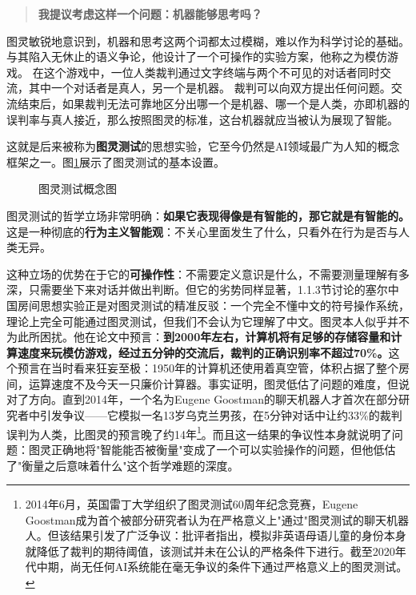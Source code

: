 \begin{quote}
\textbf{我提议考虑这样一个问题：机器能够思考吗？}
\end{quote}

图灵敏锐地意识到，机器和思考这两个词都太过模糊，难以作为科学讨论的基础。
与其陷入无休止的语义争论，他设计了一个可操作的实验方案，他称之为模仿游戏。
在这个游戏中，一位人类裁判通过文字终端与两个不可见的对话者同时交流，其中一个对话者是真人，另一个是机器。
裁判可以向双方提出任何问题。交流结束后，如果裁判无法可靠地区分出哪一个是机器、哪一个是人类，亦即机器的误判率与真人接近，那么按照图灵的标准，这台机器就应当被认为展现了智能。

这就是后来被称为\textbf{图灵测试}的思想实验，它至今仍然是AI领域最广为人知的概念框架之一。图\ref{fig:ch1_05}展示了图灵测试的基本设置。

\begin{figure}[htbp]
\centering
{}
\caption{图灵测试概念图}
\label{fig:ch1_05}
\end{figure}

图灵测试的哲学立场非常明确：\textbf{如果它表现得像是有智能的，那它就是有智能的。}这是一种彻底的\textbf{行为主义智能观}：不关心里面发生了什么，只看外在行为是否与人类无异。

这种立场的优势在于它的\textbf{可操作性}：不需要定义意识是什么，不需要测量理解有多深，只需要坐下来对话并做出判断。但它的劣势同样显著，1.1.3节讨论的塞尔中国房间思想实验正是对图灵测试的精准反驳：一个完全不懂中文的符号操作系统，理论上完全可能通过图灵测试，但我们不会认为它理解了中文。图灵本人似乎并不为此所困扰。他在论文中预言：\textbf{到2000年左右，计算机将有足够的存储容量和计算速度来玩模仿游戏，经过五分钟的交流后，裁判的正确识别率不超过70\%。}这个预言在当时看来狂妄至极：1950年的计算机还使用着真空管，体积占据了整个房间，运算速度不及今天一只廉价计算器。事实证明，图灵低估了问题的难度，但说对了方向。直到2014年，一个名为Eugene Goostman的聊天机器人才首次在部分研究者中引发争议——它模拟一名13岁乌克兰男孩，在5分钟对话中让约33\%的裁判误判为人类，比图灵的预言晚了约14年\footnote{2014年6月，英国雷丁大学组织了图灵测试60周年纪念竞赛，Eugene Goostman成为首个被部分研究者认为在严格意义上"通过"图灵测试的聊天机器人。但该结果引发了广泛争议：批评者指出，模拟非英语母语儿童的身份本身就降低了裁判的期待阈值，该测试并未在公认的严格条件下进行。截至2020年代中期，尚无任何AI系统能在毫无争议的条件下通过严格意义上的图灵测试。}。而且这一结果的争议性本身就说明了问题：图灵正确地将"智能能否被衡量"变成了一个可以实验操作的问题，但他低估了"衡量之后意味着什么"这个哲学难题的深度。

